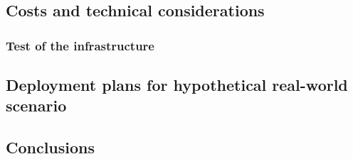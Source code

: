 \subsection{Costs and technical considerations}
\label{subsec:costs}



\subsubsection{Test of the infrastructure}
\label{subsubsec:test}

\subsection{Deployment plans for hypothetical real-world scenario}
\label{subsec:deployment-real-world}

\subsection{Conclusions}
\label{subsec:conclusions}
